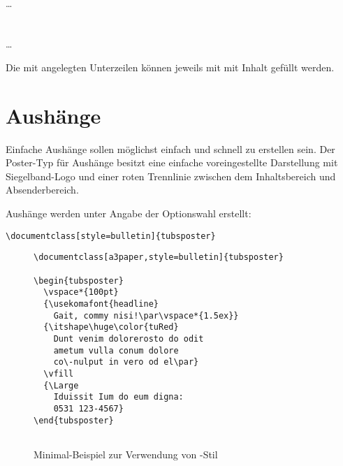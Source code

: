 \begin{Declaration}
  \\%
  \quad\dots\\
  \\
  \\%
  \quad\dots\\
\end{Declaration}

Die mit  angelegten Unterzeilen können jeweils mit 
 mit Inhalt gefüllt werden.


\clearpage
\section{Aushänge}

Einfache Aushänge sollen möglichst einfach und schnell zu erstellen sein.
Der Poster-Typ für Aushänge besitzt eine einfache voreingestellte Darstellung
mit Siegelband-Logo und einer roten Trennlinie zwischen dem Inhaltsbereich
und Absenderbereich.

Aushänge werden unter Angabe der Optionswahl
 erstellt:
\begin{lstlisting}
\documentclass[style=bulletin]{tubsposter}
\end{lstlisting}

\begin{figure}[!ht]
\begin{minipage}{0.65\textwidth}
\begin{lstlisting}
\documentclass[a3paper,style=bulletin]{tubsposter}

\begin{tubsposter}
  \vspace*{100pt}
  {\usekomafont{headline}
    Gait, commy nisi!\par\vspace*{1.5ex}}
  {\itshape\huge\color{tuRed}
    Dunt venim dolorerosto do odit
    ametum vulla conum dolore
    co\-nulput in vero od el\par}
  \vfill
  {\Large
    Iduissit Ium do eum digna:
    0531 123-4567}
\end{tubsposter}


\end{lstlisting}
\end{minipage}
\begin{minipage}{0.35\textwidth}
\end{minipage}
\caption{Minimal-Beispiel zur Verwendung von -Stil 
  }
\end{figure}

